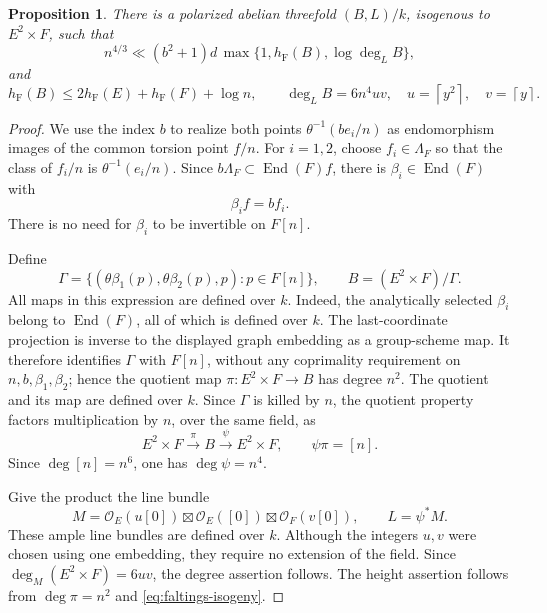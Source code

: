 \documentclass[11pt,a4paper]{article}
\numberwithin{equation}{section}
\newtheorem{proposition}[theorem]{Proposition}
\theoremstyle{definition}
\theoremstyle{remark}
\newcommand{\End}{\operatorname{End}}
\newcommand{\hF}{h_{\mathrm F}}
\newcommand{\ceil}[1]{\left\lceil#1\right\rceil}
\begin{document}
\begin{proposition}\label{prop:threefold}
There is a polarized abelian threefold \((B,L)/k\), isogenous to
\(E^2\times F\), such that
\begin{equation}\label{eq:threefold-estimate}
 n^{4/3}\ll
 (b^2+1)d\,\max\{1,\hF(B),\log\deg_L B\},
\end{equation}
and
\begin{equation}\label{eq:B-height-degree}
 \hF(B)\le2\hF(E)+\hF(F)+\log n,\qquad
 \deg_LB=6n^4uv,
 \quad u=\ceil{y^2},\quad v=\ceil y.
\end{equation}
\end{proposition}

\begin{proof}
We use the index \(b\) to realize both points
\(\theta^{-1}(be_i/n)\) as endomorphism images of the common
torsion point \(f/n\). For \(i=1,2\), choose \(f_i\in\Lambda_F\)
so that the class of \(f_i/n\) is \(\theta^{-1}(e_i/n)\).
Since \(b\Lambda_F\subset\End(F)f\), there is \(\beta_i\in\End(F)\)
with
\begin{equation}\label{eq:beta}
 \beta_if=bf_i.
\end{equation}
There is no need for \(\beta_i\) to be invertible on \(F[n]\).

Define
\[
 \Gamma=\{(\theta\beta_1(p),\theta\beta_2(p),p):p\in F[n]\},
 \qquad B=(E^2\times F)/\Gamma.
\]
All maps in this expression are defined over \(k\).
Indeed, the analytically selected \(\beta_i\) belong to \(\End(F)\),
all of which is defined over \(k\). The last-coordinate projection
is inverse to the displayed graph embedding as a group-scheme map.
It therefore identifies \(\Gamma\) with \(F[n]\), without any
coprimality requirement on \(n,b,\beta_1,\beta_2\); hence
the quotient map \(\pi:E^2\times F\to B\) has degree \(n^2\).
The quotient and its map are defined over \(k\). Since \(\Gamma\)
is killed by \(n\), the quotient property factors multiplication
by \(n\), over the same field, as
\[
 E^2\times F\xrightarrow{\pi}B\xrightarrow{\psi}E^2\times F,
 \qquad\psi\pi=[n].
\]
Since \(\deg[n]=n^6\), one has \(\deg\psi=n^4\).

Give the product the line bundle
\[
 M=\mathcal O_E(u[0])\boxtimes
    \mathcal O_E([0])\boxtimes\mathcal O_F(v[0]),
 \qquad L=\psi^*M.
\]
These ample line bundles are defined over \(k\).
Although the integers \(u,v\) were chosen using one embedding,
they require no extension of the field. Since
\(\deg_M(E^2\times F)=6uv\), the degree assertion follows.
The height assertion follows from \(\deg\pi=n^2\) and
\eqref{eq:faltings-isogeny}.


\end{proof}
\end{document}
